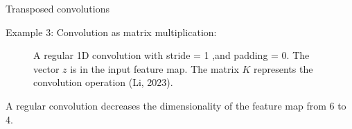 \begin{vbframe}{Transposed convolutions}
\framebreak 

Example 3: Convolution as matrix multiplication:
\begin{figure}
\centering
{}
\caption{A regular 1D convolution with  stride = 1 ,and padding = 0. The vector $z$ is in the input feature map. The matrix $K$ represents the convolution operation (Li, 2023).}
\end{figure}
  A regular convolution decreases the dimensionality of the feature map from 6 to 4.\\
\end{vbframe}

